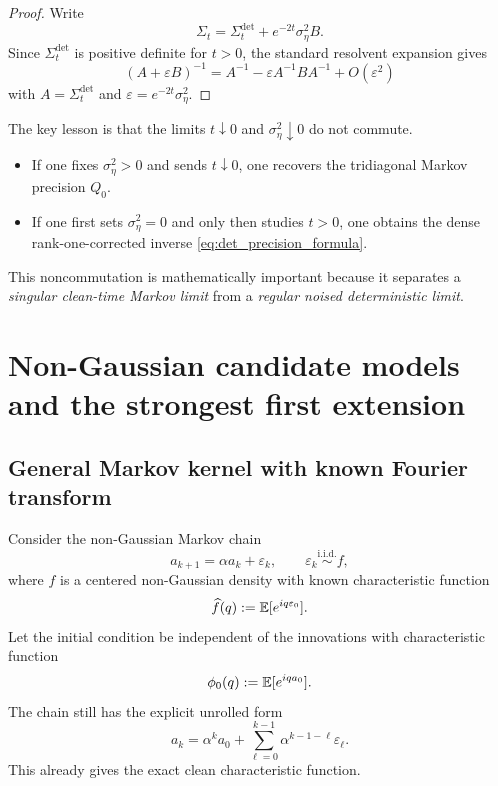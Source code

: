 \documentclass[11pt]{article}
\begin{document}
\begin{proof}
Write
\begin{equation}
 \Sigma_t=\Sigma_t^{\mathrm{det}}+e^{-2t}\sigma_\eta^2B.
\end{equation}
Since $\Sigma_t^{\mathrm{det}}$ is positive definite for $t>0$, the standard resolvent expansion gives
\begin{equation}
 (A+\varepsilon B)^{-1}=A^{-1}-\varepsilon A^{-1}BA^{-1}+O(\varepsilon^2)
\end{equation}
with $A=\Sigma_t^{\mathrm{det}}$ and $\varepsilon=e^{-2t}\sigma_\eta^2$.
\end{proof}

The key lesson is that the limits $t\downarrow 0$ and $\sigma_\eta^2\downarrow 0$ do not commute.

\begin{itemize}[leftmargin=1.2cm]
\item If one fixes $\sigma_\eta^2>0$ and sends $t\downarrow 0$, one recovers the tridiagonal Markov precision $Q_0$.
\item If one first sets $\sigma_\eta^2=0$ and only then studies $t>0$, one obtains the dense rank-one-corrected inverse \eqref{eq:det_precision_formula}.
\end{itemize}
This noncommutation is mathematically important because it separates a \emph{singular clean-time Markov limit} from a \emph{regular noised deterministic limit}.

\section{Non-Gaussian candidate models and the strongest first extension}

\subsection{General Markov kernel with known Fourier transform}

Consider the non-Gaussian Markov chain
\begin{equation}\label{eq:general_non_gaussian_chain}
 a_{k+1}=\alpha a_k+\varepsilon_k,
 \qquad \varepsilon_k\stackrel{\mathrm{i.i.d.}}{\sim}f,
\end{equation}
where $f$ is a centered non-Gaussian density with known characteristic function
\begin{equation}
 \widehat f(q):=\mathbb{E}[e^{iq\varepsilon_0}].
\end{equation}
Let the initial condition be independent of the innovations with characteristic function
\begin{equation}
 \phi_0(q):=\mathbb{E}[e^{iq a_0}].
\end{equation}
The chain still has the explicit unrolled form
\begin{equation}\label{eq:unrolled_general_chain}
 a_k=\alpha^k a_0+\sum_{\ell=0}^{k-1}\alpha^{k-1-\ell}\varepsilon_\ell.
\end{equation}
This already gives the exact clean characteristic function.
\end{document}
